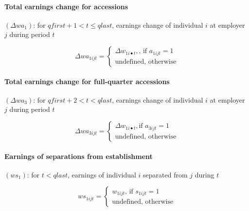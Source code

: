 \paragraph{Total earnings change for accessions}


$\left( \Delta wa_{1}\right) $: for $qfirst+1<t\leq qlast$, earnings change
of individual $i$ at employer $j$ during period $t$

\begin{equation}
\Delta wa_{1ijt}=\left\{ 
\begin{array}{l}
{\Delta w_{1i\bullet t},}\text{, if }{a_{1ijt}=1} \\ 
\text{{undefined, otherwise}}%
\end{array}%
\right.
\end{equation}

\paragraph{Total earnings change for full-quarter accessions}


$\left( \Delta wa_{3}\right) $: for $qfirst+2<t<qlast$, earnings change of
individual $i$ at employer $j$ during period $t$

\begin{equation}
\Delta wa_{3ijt}=\left\{ 
\begin{array}{l}
{\Delta w_{1i\bullet t},}\text{if }{a_{3ijt}=1} \\ 
\text{{undefined, otherwise}}%
\end{array}%
\right.
\end{equation}

\paragraph{Earnings of separations from establishment}

 

$\left( ws_{1}\right) $: for $t<qlast$, earnings of individual $i$ separated
from $j$ during $t$

\begin{equation}
ws_{1ijt}=\left\{ 
\begin{array}{l}
{w_{1ijt}}\text{, if }{s_{1ijt}=1} \\ 
\text{{undefined, otherwise}}%
\end{array}%
\right.
\end{equation}

